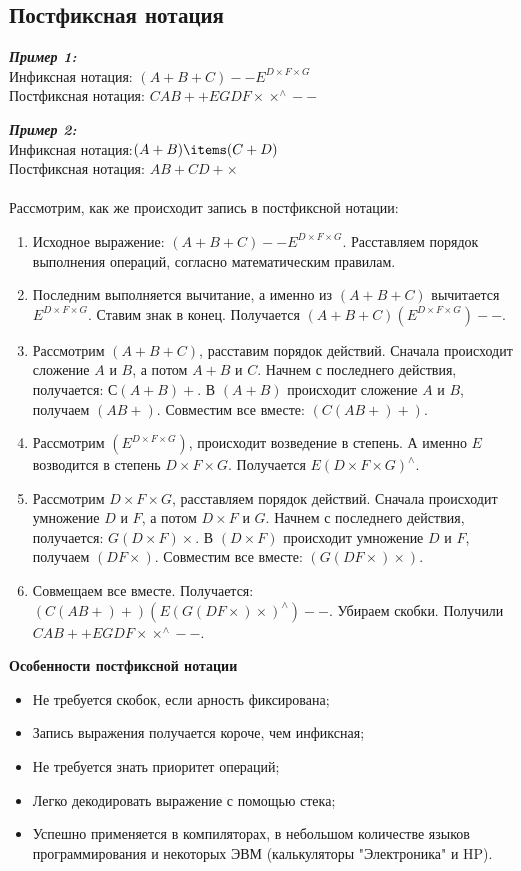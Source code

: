 \subsection{Постфиксная нотация}
\textbf{\emph{Пример 1:}}
\\Инфиксная нотация: $(A + B + C) -- E^{D\times F\times G}$
\\Постфиксная нотация: $CAB++EGDF\times\times ^{\wedge}--$
\\
\par\textbf{\emph{Пример 2:}}
\\Инфиксная нотация:$ ( A + B ) \items ( C + D )$
\\Постфиксная нотация: $A B + C D + \times$
\\
\\Рассмотрим, как же происходит запись в постфиксной нотации:
\begin{enumerate}
\item Исходное выражение: $(A + B + C) -- E^{D\times F\times G}$. Расставляем порядок выполнения операций, согласно математическим правилам.
\item Последним выполняется вычитание, а именно из $(A + B + C)$ вычитается $E^{D\times F\times G}$. Ставим знак в конец. Получается $(A + B + C)(E^{D\times F\times G})--$.
\item Рассмотрим $(A + B + C)$, расставим порядок действий. Сначала происходит сложение $A$ и $B$, а потом $A+B$ и $C$. Начнем с последнего действия, получается: $С(A+B)+$. В $(A+B)$ происходит сложение $A$ и $B$, получаем $(AB+)$. Совместим все вместе: $(C(AB+)+)$.
\item Рассмотрим $(E^{D\times F\times G})$, происходит возведение в степень. А именно $E$ возводится в степень $D\times F\times G$. Получается $E(D\times F\times G)^{\wedge}$.
\item Рассмотрим $D\times F\times G$, расставляем порядок действий. Сначала происходит умножение $D$ и $F$, а потом $D\times F$ и $G$. Начнем с последнего действия, получается: $G(D \times F)\times$. В $(D \times F)$ происходит умножение $D$ и $F$, получаем $(DF\times)$. Совместим все вместе: $(G(DF\times )\times)$.
\item Совмещаем все вместе. Получается: $(C(AB+)+)(E(G(DF\times)\times)^{\wedge})--$. Убираем скобки. Получили $CAB++EGDF\times\times ^{\wedge}--$.
\end{enumerate}
\begin{center}
  \textbf{Особенности постфиксной нотации}
\end{center}
\begin{itemize}
  \item Не требуется скобок, если арность фиксирована;
  \item Запись выражения получается короче, чем инфиксная;
  \item Не требуется знать приоритет операций;
  \item Легко декодировать выражение с помощью стека;
  \item Успешно применяется в компиляторах, в небольшом количестве языков программирования и некоторых ЭВМ (калькуляторы "Электроника" и HP).
\end{itemize}
